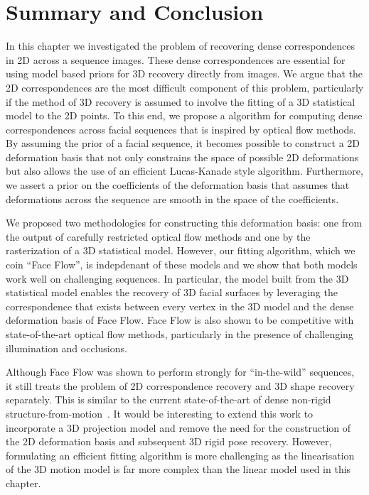 \section{Summary and Conclusion}\label{sec:face_flow_conclusion}
In this chapter we investigated the problem of recovering dense correspondences
in 2D across a sequence images. These dense correspondences are essential
for using model based priors for 3D recovery directly from images. We argue that
the 2D correspondences are the most difficult component of this problem, 
particularly if the method of 3D recovery is assumed to involve the fitting
of a 3D statistical model to the 2D points. To this end, we propose a algorithm
for computing dense correspondences across facial sequences that is inspired by
optical flow methods. By assuming the prior of a facial sequence, it becomes
possible to construct a 2D deformation basis that not only constrains the space
of possible 2D deformations but also allows the use of an efficient Lucas-Kanade
style algorithm. Furthermore, we assert a prior on the coefficients
of the deformation basis that assumes that deformations across the sequence
are smooth in the space of the coefficients.

We proposed two methodologies for constructing this deformation basis: one
from the output of carefully restricted optical flow methods and one by
the rasterization of a 3D statistical model. However, our fitting algorithm,
which we coin ``Face Flow'', is indepdenant of these models and we show that
both models work well on challenging sequences. In particular, the model built
from the 3D statistical model enables the recovery of 3D facial surfaces by 
leveraging the correspondence that exists between every vertex in the 3D model
and the dense deformation basis of Face Flow. Face Flow is also shown to be
competitive with state-of-the-art optical flow methods, particularly in
the presence of challenging illumination and occlusions.

Although Face Flow was shown to perform strongly for ``in-the-wild'' sequences,
it still treats the problem of 2D correspondence recovery and 3D shape recovery
separately.  This is similar to the current state-of-the-art of dense non-rigid
structure-from-motion~\cite{garg2013dense}. It would be interesting to
extend this work to incorporate a 3D projection model and remove the need
for the construction of the 2D deformation basis and subsequent 3D rigid pose
recovery. However, formulating an efficient fitting algorithm is more challenging
as the linearisation of the 3D motion model is far more complex than the linear
model used in this chapter.